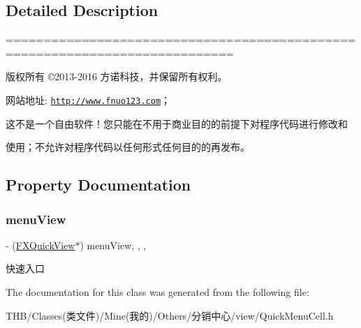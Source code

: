 \subsection{Detailed Description}
============================================================================

版权所有 ©2013-\/2016 方诺科技，并保留所有权利。

网站地址\+: \href{http://www.fnuo123.com}{\tt http\+://www.\+fnuo123.\+com}； 



这不是一个自由软件！您只能在不用于商业目的的前提下对程序代码进行修改和

使用；不允许对程序代码以任何形式任何目的的再发布。 

 

\subsection{Property Documentation}
\mbox{\label{interface_quick_menu_cell_aed1333838656d44b390bbefe6299325c}} 
\subsubsection{\texorpdfstring{menu\+View}{menuView}}
{\footnotesize\ttfamily -\/ (\mbox{\hyperlink{interface_f_x_quick_view}{F\+X\+Quick\+View}}$\ast$) menu\+View\hspace{0.3cm}{\ttfamily [read]}, {\ttfamily [write]}, {\ttfamily [nonatomic]}, {\ttfamily [strong]}}

快速入口 

The documentation for this class was generated from the following file\+:\begin{DoxyCompactItemize}
\item 
T\+H\+B/\+Classes(类文件)/\+Mine(我的)/\+Others/分销中心/view/Quick\+Menu\+Cell.\+h\end{DoxyCompactItemize}
